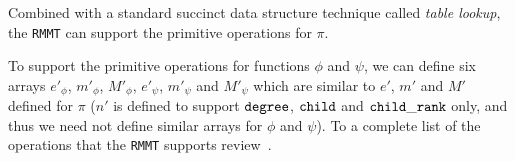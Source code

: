 Combined with a standard succinct data structure technique called {\em table lookup}, the {\tt RMMT} can support the primitive operations for $\pi$.%

To support the primitive operations for functions $\phi$ and $\psi$, we can define six arrays $e'_{\phi}$, $m'_{\phi}$, $M'_{\phi}$, $e'_{\psi}$, $m'_{\psi}$ and $M'_{\psi}$ which are similar to $e'$, $m'$ and $M'$ defined for $\pi$ ($n'$ is defined to support $\mathtt{degree}$, $\mathtt{child}$ and $\mathtt{child\_rank}$ only, and thus we need not define similar arrays for $\phi$ and $\psi$). To a complete list of the operations that the {\tt RMMT} supports review~\cite{Navarro:2014:FFS:2620785.2601073}.
 
